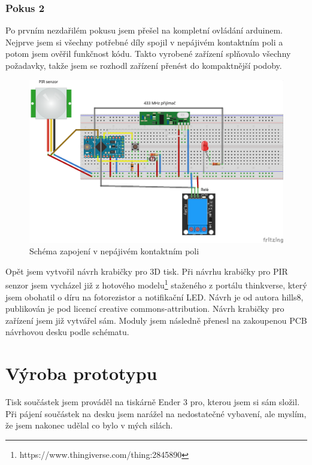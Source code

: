 \documentclass[11pt,a4paper,twoside,openright]{report}
\begin{document}
\subsubsection{Pokus 2}

Po prvním nezdařilém pokusu jsem přešel na kompletní ovládání arduinem. Nejprve jsem si všechny potřebné díly spojil v nepájivém kontaktním poli a potom jsem ověřil funkčnost kódu. Takto vyrobené zařízení splňovalo všechny požadavky, takže jsem se rozhodl zařízení přenést do kompaktnější podoby.


\begin{figure}[htb]
\centering
\includegraphics[width=1\hsize]{img/přijímač_zásuvka_bb.png}
\caption{Schéma zapojení v nepájivém kontaktním poli}\end{figure}

Opět jsem vytvořil návrh krabičky pro 3D tisk. Při návrhu krabičky pro PIR senzor jsem vycházel již z hotového modelu\footnote{https://www.thingiverse.com/thing:2845890} staženého z portálu thinkverse, který jsem obohatil o díru na fotorezistor a notifikační LED. Návrh je od autora hills8, publikován je pod licencí creative commons-attribution. Návrh krabičky pro zařízení jsem již vytvářel sám. Moduly jsem následně přenesl na zakoupenou PCB návrhovou desku podle schématu.


\section{Výroba prototypu}

Tisk součástek jsem prováděl na tiskárně Ender 3 pro, kterou jsem si sám složil. Při pájení součástek na desku jsem narážel na nedostatečné vybavení, ale myslím, že jsem nakonec udělal co bylo v mých silách. 
\end{document}
